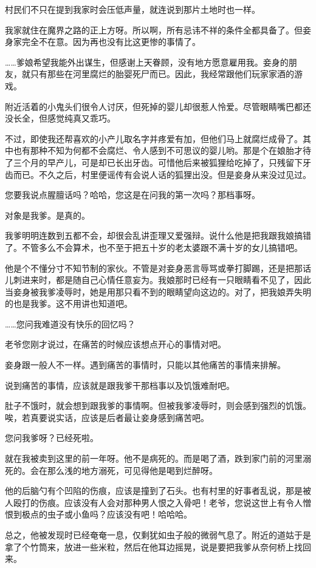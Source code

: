 \documentclass[portrait,a4paper]{article}
\begin{document}
村民们不只在提到我家时会压低声量，就连说到那片土地时也一样。

我家就住在魔界之路的正上方呀。所以啊，所有忌讳不祥的条件全都具备了。但妾身家完全不在意。因为再也没有比这更惨的事情了。

……爹娘希望我能外出谋生，但感谢上天眷顾，没有地方愿意雇用我。妾身的朋友，就只有那些在河里腐烂的胎婴死尸而已。因此，我经常跟他们玩家家酒的游戏。

附近活着的小鬼头们很令人讨厌，但死掉的婴儿却很惹人怜爱。尽管眼睛嘴巴都还没长全，但感觉纯真又乖巧。

不过，即使我还帮喜欢的小产儿取名字并疼爱有加，但他们马上就腐烂成骨了。其中也有那种不知为何都不会腐烂、令人感到不可思议的婴儿哟。那是个在娘胎才待了三个月的早产儿，可是却已长出牙齿。可惜他后来被狐狸给吃掉了，只残留下牙齿而已。不久之后，村里便谣传有会说人话的狐狸出没。但是妾身从来没过见过。

您要我说点腥膻话吗？哈哈，您这是在问我的第一次吗？那档事呀。

对象是我爹。是真的。

我爹明明连数到五都不会，却很会乱讲歪理又爱强辩。说什么他是把我跟我娘搞错了。不管多么不会算术，也不至于把五十岁的老太婆跟不满十岁的女儿搞错吧。

他是个不懂分寸不知节制的家伙。不管是对妾身恶言辱骂或拳打脚踢，还是把那话儿刺进来时，都是随自己心情任意妄为。我娘那时已经有一只眼睛看不见了，因此当妾身被我爹凌辱时，她是用那只看不到的眼睛望向这边的。对了，把我娘弄失明的也是我爹。这不用讲也知道吧。

……您问我难道没有快乐的回忆吗？

老爷您刚才说过，在痛苦的时候应该想点开心的事情对吧。

妾身跟一般人不一样。遇到痛苦的事情时，只能以其他痛苦的事情来排解。

说到痛苦的事情，应该就是跟我爹干那档事以及饥饿难耐吧。

肚子不饿时，就会想到跟我爹的事情啊。但被我爹凌辱时，则会感到强烈的饥饿。唉，若真要说实话，应该是后者最让妾身感到痛苦吧。

您问我爹呀？已经死啦。

就在我被卖到这里的前一年呀。他不是病死的。而是喝了酒，跌到家门前的河里溺死的。会在那么浅的地方溺死，可见得他是喝到烂醉呀。

他的后脑勺有个凹陷的伤痕，应该是撞到了石头。也有村里的好事者乱说，那是被人殴打的伤痕。应该没有人会对那种男人恨之入骨吧！老爷，您说这世上有令人憎恨到极点的虫子或小鱼吗？应该没有吧！哈哈哈。

总之，他被发现时已经奄奄一息，仅剩犹如虫子般的微弱气息了。附近的道姑于是拿了个竹筒来，放进一些米粒，然后在他耳边摇晃，说是要把我爹从奈何桥上找回来。
\end{document}
